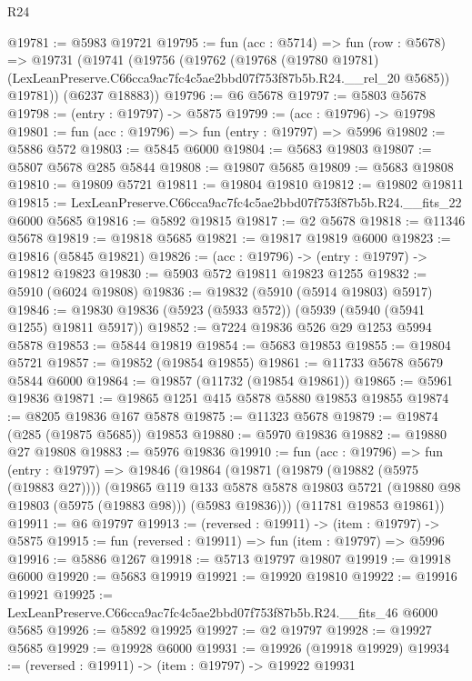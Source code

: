 \begin{lexlean}{R24}
\begin{coremodule}
@19781 := @5983 @19721
@19795 := fun (acc : @5714) =>
  fun (row : @5678) =>
  @19731
    (@19741
      (@19756
        (@19762
          (@19768
            (@19780 @19781)
            (LexLeanPreserve.C66cca9ac7fc4c5ae2bbd07f753f87b5b.R24.__rel_20 @5685))
          @19781))
      (@6237 @18883))
@19796 := @6 @5678
@19797 := @5803 @5678
@19798 := (entry : @19797) -> @5875
@19799 := (acc : @19796) -> @19798
@19801 := fun (acc : @19796) => fun (entry : @19797) => @5996
@19802 := @5886 @572
@19803 := @5845 @6000
@19804 := @5683 @19803
@19807 := @5807 @5678 @285 @5844
@19808 := @19807 @5685
@19809 := @5683 @19808
@19810 := @19809 @5721
@19811 := @19804 @19810
@19812 := @19802 @19811
@19815 := LexLeanPreserve.C66cca9ac7fc4c5ae2bbd07f753f87b5b.R24.__fits_22 @6000 @5685
@19816 := @5892 @19815
@19817 := @2 @5678
@19818 := @11346 @5678
@19819 := @19818 @5685
@19821 := @19817 @19819 @6000
@19823 := @19816 (@5845 @19821)
@19826 := (acc : @19796) -> (entry : @19797) -> @19812 @19823
@19830 := @5903 @572 @19811 @19823 @1255
@19832 := @5910 (@6024 @19808)
@19836 := @19832 (@5910 (@5914 @19803) @5917)
@19846 := @19830 @19836 (@5923 (@5933 @572)) (@5939 (@5940 (@5941 @1255) @19811 @5917))
@19852 := @7224 @19836 @526 @29 @1253 @5994 @5878
@19853 := @5844 @19819
@19854 := @5683 @19853
@19855 := @19804 @5721
@19857 := @19852 (@19854 @19855)
@19861 := @11733 @5678 @5679 @5844 @6000
@19864 := @19857 (@11732 (@19854 @19861))
@19865 := @5961 @19836
@19871 := @19865 @1251 @415 @5878 @5880 @19853 @19855
@19874 := @8205 @19836 @167 @5878
@19875 := @11323 @5678
@19879 := @19874 (@285 (@19875 @5685)) @19853
@19880 := @5970 @19836
@19882 := @19880 @27 @19808
@19883 := @5976 @19836
@19910 := fun (acc : @19796) =>
  fun (entry : @19797) =>
  @19846
    (@19864
      (@19871
        (@19879 (@19882 (@5975 (@19883 @27))))
        (@19865
          @119
          @133
          @5878
          @5878
          @19803
          @5721
          (@19880 @98 @19803 (@5975 (@19883 @98)))
          (@5983 @19836)))
      (@11781 @19853 @19861))
@19911 := @6 @19797
@19913 := (reversed : @19911) -> (item : @19797) -> @5875
@19915 := fun (reversed : @19911) => fun (item : @19797) => @5996
@19916 := @5886 @1267
@19918 := @5713 @19797 @19807
@19919 := @19918 @6000
@19920 := @5683 @19919
@19921 := @19920 @19810
@19922 := @19916 @19921
@19925 := LexLeanPreserve.C66cca9ac7fc4c5ae2bbd07f753f87b5b.R24.__fits_46 @6000 @5685
@19926 := @5892 @19925
@19927 := @2 @19797
@19928 := @19927 @5685
@19929 := @19928 @6000
@19931 := @19926 (@19918 @19929)
@19934 := (reversed : @19911) -> (item : @19797) -> @19922 @19931

\end{coremodule}
\end{lexlean}
